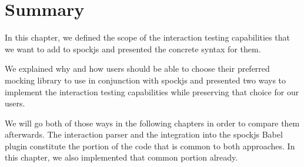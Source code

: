 \section{Summary}
In this chapter, we defined the scope
of the interaction testing capabilities
that we want to add to spockjs
and presented the concrete syntax for them.

We explained why and how users should be able
to choose their preferred mocking library
to use in conjunction with spockjs and
presented two ways to implement the interaction testing capabilities
while preserving that choice for our users.

We will go both of those ways in the following chapters
in order to compare them afterwards.
The interaction parser and
the integration into the spockjs Babel plugin
constitute the portion of the code
that is common to both approaches.
In this chapter, we also implemented that common portion already.
